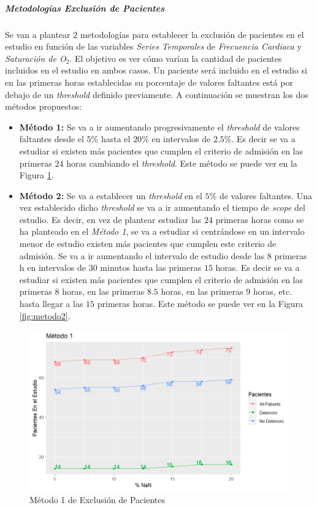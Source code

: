 \newpage

\subparagraph{Metodologías Exclusión de Pacientes}\label{sec:metodologias_exclusion_pacientes}

Se van a plantear $2$ metodologías para establecer la exclusión de pacientes en el estudio en función de las variables \textit{Series Temporales} de \textit{Frecuencia Cardiaca} y \textit{Saturación de O$_2$}. El objetivo es ver cómo varían la cantidad de pacientes incluidos en el estudio en ambos casos. Un paciente será incluido en el estudio si en las primeras horas establecidas su porcentaje de valores faltantes está por debajo de un \textit{threshold} definido previamente. A continuación se muestran los dos métodos propuestos: 

\begin{itemize}
    \item \textbf{Método 1:} Se va a ir aumentando progresivamente el \textit{threshold} de valores faltantes desde el $5 \%$ hasta el $20 \%$ en intervalos de $2.5 \%$.  Es decir se va a estudiar si existen más pacientes que cumplen el criterio de admisión en las primeras $24$ horas cambiando el \textit{threshold}. Este método se puede ver en la Figura \ref{fig:metodo1}.
    \item \textbf{Método 2:} Se va a establecer un \textit{threshold} en el $5 \%$ de valores faltantes. Una vez establecido dicho \textit{threshold} se va a ir aumentando el tiempo de \textit{scope} del estudio. Es decir, en vez de plantear estudiar las $24$ primeras horas como se ha planteado en el \textit{Método 1}, se va a estudiar si centrándose en un intervalo menor de estudio existen más pacientes que cumplen este criterio de admisión. Se va a ir aumentando el intervalo de estudio desde las $8$ primeras h en intervalos de $30$ minutos hasta las primeras $15$ horas. Es decir se va a estudiar si existen más pacientes que cumplen el criterio de admisión en las primeras $8$ horas, en las primeras $8.5$ horas, en las primeras $9$ horas, etc. hasta llegar a las $15$ primeras horas. Este método se puede ver en la Figura \ref{fig:metodo2}.
\end{itemize}

\begin{figure}[H]
    \centering
    \includegraphics[scale = 1]{./img/metodo1.png}
    \caption{Método 1 de Exclusión de Pacientes}
    \label{fig:metodo1}
\end{figure}

